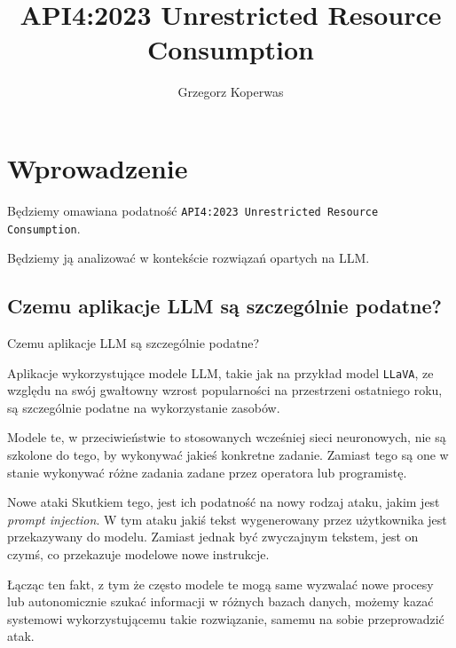 \documentclass[12pt,aspectratio=169]{beamer}
\title{API4:2023 Unrestricted Resource Consumption}
\author{Grzegorz Koperwas}
\begin{document}
\begin{frame}
\maketitle
\end{frame}

\section{Wprowadzenie}
\begin{frame}

Będziemy omawiana podatność \texttt{API4:2023 Unrestricted Resource
Consumption}. 

\pause

Będziemy ją analizować w kontekście rozwiązań opartych na LLM.

\end{frame}

\subsection*{Czemu aplikacje LLM są szczególnie podatne?}
\begin{frame}{Czemu aplikacje LLM są szczególnie podatne?}

Aplikacje wykorzystujące modele LLM, takie jak na przykład model
\texttt{LLaVA}\cite{liu2023improvedllava}, ze względu 
na swój gwałtowny wzrost popularności na przestrzeni ostatniego roku, są
szczególnie podatne na wykorzystanie zasobów.

\pause

Modele te, w przeciwieństwie to stosowanych wcześniej sieci neuronowych, nie są
szkolone do tego, by wykonywać jakieś konkretne zadanie. Zamiast tego 
są one w stanie wykonywać różne zadania zadane przez operatora lub programistę.
\end{frame}

\begin{frame}{Nowe ataki}
Skutkiem tego, jest ich podatność na nowy rodzaj ataku, jakim jest \emph{prompt
injection}\cite{greshake2023youve}. W tym ataku jakiś tekst wygenerowany przez 
użytkownika jest przekazywany do modelu. Zamiast jednak być zwyczajnym tekstem, 
jest on czymś, co przekazuje modelowe nowe instrukcje.

\pause

Łącząc ten fakt, z tym że często modele te mogą same wyzwalać nowe procesy lub
autonomicznie szukać informacji w różnych bazach danych, możemy kazać systemowi 
wykorzystującemu takie rozwiązanie, samemu na sobie przeprowadzić atak.

\end{frame}
\end{document}
